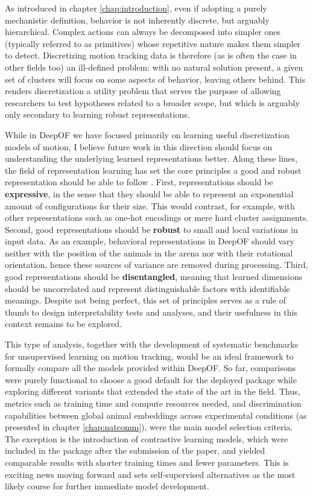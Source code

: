 As introduced in chapter \ref{chap:introduction}, even if adopting a purely mechanistic definition, behavior is not inherently discrete, but arguably hierarchical. Complex actions can always be decomposed into simpler ones (typically referred to as primitives) whose repetitive nature makes them simpler to detect. Discretizing motion tracking data is therefore (as is often the case in other fields too) an ill-defined problem: with no natural solution present, a given set of clusters will focus on some aspects of behavior, leaving others behind. This renders discretization a utility problem that serves the purpose of allowing researchers to test hypotheses related to a broader scope, but which is arguably only secondary to learning robust representations.

While in DeepOF we have focused primarily on learning useful discretization models of motion, I believe future work in this direction should focus on understanding the underlying learned representations better. Along these lines, the field of representation learning has set the core principles a good and robust representation should be able to follow \cite{Le-Khac2020ContrastiveReview}. First, representations should be \textbf{expressive}, in the sense that they should be able to represent an exponential amount of configurations for their size. This would contrast, for example, with other representations such as one-hot encodings or mere hard cluster assignments. Second, good representations should be \textbf{robust} to small and local variations in input data. As an example, behavioral representations in DeepOF should vary neither with the position of the animals in the arena nor with their rotational orientation, hence these sources of variance are removed during processing. Third, good representations should be \textbf{disentangled}, meaning that learned dimensions should be uncorrelated and represent distinguishable factors with identifiable meanings. Despite not being perfect, this set of principles serves as a rule of thumb to design interpretability tests and analyses, and their usefulness in this context remains to be explored.

This type of analysis, together with the development of systematic benchmarks for unsupervised learning on motion tracking, would be an ideal framework to formally compare all the models provided within DeepOF. So far, comparisons were purely functional to choose a good default for the deployed package while exploring different variants that extended the state of the art in the field. Thus, metrics such as training time and compute resources needed, and discrimination capabilities between global animal embeddings across experimental conditions (as presented in chapter \ref{chap:natcomm}), were the main model selection criteria. The exception is the introduction of contrastive learning models, which were included in the package after the submission of the paper, and yielded comparable results with shorter training times and fewer parameters. This is exciting news moving forward and sets self-supervised alternatives as the most likely course for further immediate model development.


